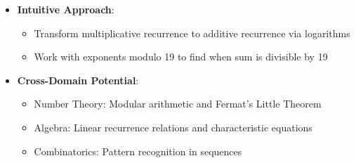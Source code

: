 \documentclass[11pt]{article}
\begin{document}
\begin{problemconfigbox}
\begin{itemize}[leftmargin=*]
    \item \textbf{Intuitive Approach}: 
    \begin{itemize}
        \item Transform multiplicative recurrence to additive recurrence via logarithms
        \item Work with exponents modulo 19 to find when sum is divisible by 19
    \end{itemize}
    
    \item \textbf{Cross-Domain Potential}: 
    \begin{itemize}
        \item Number Theory: Modular arithmetic and Fermat's Little Theorem
        \item Algebra: Linear recurrence relations and characteristic equations
        \item Combinatorics: Pattern recognition in sequences
    \end{itemize}
\end{itemize}
\end{problemconfigbox}
\end{document}
